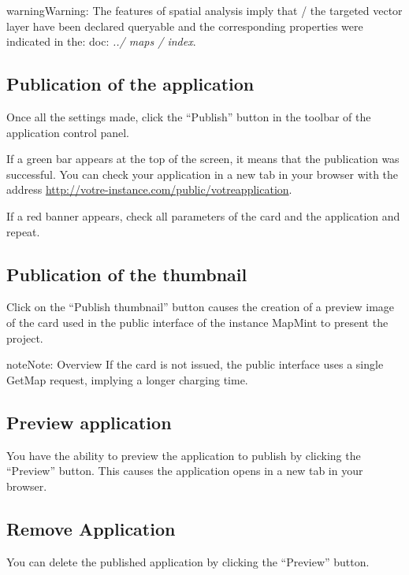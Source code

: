 \documentclass[letterpaper,10pt,english]{sphinxmanual}
\begin{document}
\begin{notice}{warning}{Warning:}
The features of spatial analysis imply that / the targeted vector layer have been declared queryable and the corresponding properties were indicated in the: doc: \emph{../ maps / index}.
\end{notice}


\subsection{Publication of the application}
\label{apps/appconfig:publication-de-l-application}
Once all the settings made, click the ``Publish'' button in the toolbar of the application control panel.

If a green bar appears at the top of the screen, it means that the publication was successful. You can check your application in a new tab in your browser with the address \href{http://votre-instance.com/public/votreapplication}{http://votre-instance.com/public/votreapplication}.

If a red banner appears, check all parameters of the card and the application and repeat.


\subsection{Publication of the thumbnail}
\label{apps/appconfig:publication-de-la-vignette}
Click on the ``Publish thumbnail'' button causes the creation of a preview image of the card used in the public interface of the instance MapMint to present the project.

\begin{notice}{note}{Note:}
Overview If the card is not issued, the public interface uses a single GetMap request, implying a longer charging time.
\end{notice}


\subsection{Preview application}
\label{apps/appconfig:previsualisation-de-l-application}
You have the ability to preview the application to publish by clicking the ``Preview'' button. This causes the application opens in a new tab in your browser.


\subsection{Remove Application}
\label{apps/appconfig:supprimer-l-application}
You can delete the published application by clicking the ``Preview'' button.



\renewcommand{\indexname}{Index}
\printindex
\end{document}
